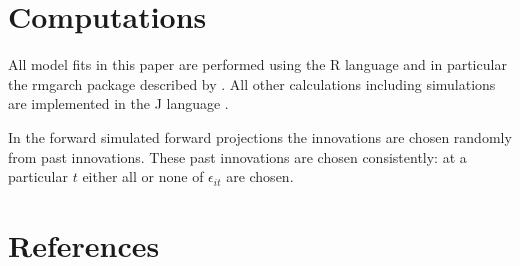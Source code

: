 \documentclass[authoryear]{elsarticle}
\newcommand{\eps}{\epsilon}
\begin{document}
\section{Computations}

All model fits in this paper are performed using the R language \citep{R-Development-Core-Team:2008aa} and in particular the rmgarch package described by \cite{ghalanos2012rmgarch}.  All other calculations including simulations are implemented in the J language \citep{iverson2003j}.

In the forward simulated forward projections the  innovations are chosen randomly from past innovations.   These past innovations are chosen consistently:  at a particular $t$ either all or none of $\eps_{it}$ are chosen.

\section*{References}

\end{document}

